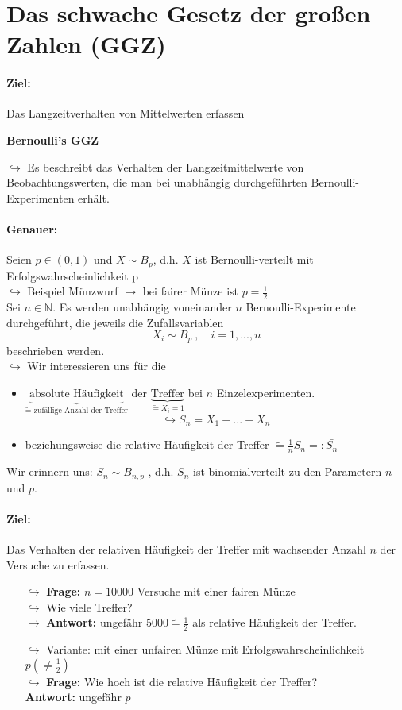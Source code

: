 \documentclass[12pt,a4paper]{article}
\begin{document}
\pagebreak	
\section{Das schwache Gesetz der großen Zahlen (GGZ)}
	\paragraph{Ziel:}
	Das Langzeitverhalten von Mittelwerten erfassen
	\begin{center}
	\textbf{Bernoulli's GGZ}
	\end{center}
	$\hookrightarrow$ Es beschreibt das Verhalten der Langzeitmittelwerte von Beobachtungswerten, die man bei unabhängig durchgeführten Bernoulli-Experimenten erhält.
	\paragraph{Genauer:}
	Seien $p\in(0,1)$ und $X\sim B_p$, d.h. $X$ ist Bernoulli-verteilt mit Erfolgswahrscheinlichkeit p\\
	$\hookrightarrow$ Beispiel Münzwurf $\rightarrow$ bei fairer Münze ist $p=\frac{1}{2}$\\
	Sei $n\in\mathbb{N}$. Es werden unabhängig voneinander $n$ Bernoulli-Experimente durchgeführt, die jeweils die Zufallsvariablen 
	$$X_i\sim B_p \: , \quad i=1,...,n$$
	beschrieben werden.\\
	$\hookrightarrow$ Wir interessieren uns für die
	\begin{itemize}
		\item $\underbrace{\text{absolute Häufigkeit}}_{\tilde{=} \text{ zufällige Anzahl der Treffer}}$ der $\underbrace{\text{Treffer}}_{\tilde{=}X_i =1}$ bei $n$ Einzelexperimenten.
		$$\hookrightarrow S_n = X_1 + ... + X_n$$
		\item beziehungsweise die relative Häufigkeit der Treffer $\tilde{=} 
\frac{1}{n}S_n =: \bar{S_n}$
	\end{itemize}
	Wir erinnern uns: $S_n \sim B_{n,p}$ , d.h. $S_n$ ist binomialverteilt zu den Parametern $n$ und $p$.
	\paragraph{Ziel:}
	Das Verhalten der relativen Häufigkeit der Treffer mit wachsender Anzahl $n$ der Versuche zu erfassen.
	
	\begin{itemize}
		\item[$\hookrightarrow$] \textbf{Frage:} $n=10000$ Versuche mit einer fairen Münze\\
		$\hookrightarrow$ Wie viele Treffer?\\
		$\rightarrow$ \textbf{Antwort:} ungefähr $5000 \tilde{=} \frac{1}{2}$ als relative Häufigkeit der Treffer.
		\item[$\hookrightarrow$] Variante: mit einer unfairen Münze mit Erfolgswahrscheinlichkeit $p\left(\neq\frac{1}{2}\right)$\\
		$\hookrightarrow$ \textbf{Frage:} Wie hoch ist die relative Häufigkeit der Treffer?\\
		\textbf{Antwort:} ungefähr $p$ 
	\end{itemize}
	
\end{document}
